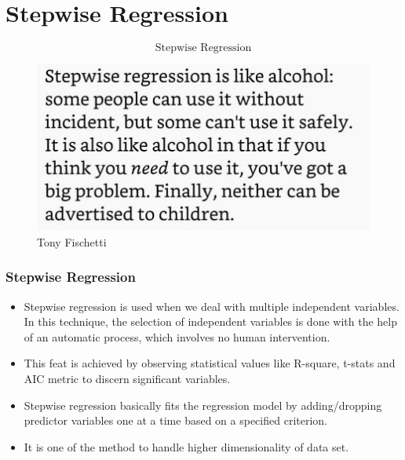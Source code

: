 \documentclass{beamer}
\begin{document}
\section{Stepwise Regression}
\begin{frame}
	\LARGE
	\[\mbox{Stepwise  Regression}\]
\end{frame}
\begin{frame}
	\begin{figure}
		\centering
		\includegraphics[width=1.1\linewidth]{images/StepwiseRegressionFischetti}
		\caption{Tony Fischetti}
		\label{fig:StepwiseRegressionFischetti}
	\end{figure}
	
\end{frame}
\begin{frame}
	\frametitle{Stepwise Regression}
	\large
	\begin{itemize}
		\item Stepwise regression is used when we deal with multiple independent variables. In this technique, the selection of independent variables is done with the help of an automatic process, which involves no human intervention.
		
		\item This feat is achieved by observing statistical values like R-square, t-stats and AIC metric to discern significant variables.
		\item Stepwise regression basically fits the regression model by adding/dropping predictor variables one at a time based on a specified criterion. 
		\item It is one of the method to handle higher dimensionality of data set.
		
	\end{itemize}
\end{frame}
\end{document}
